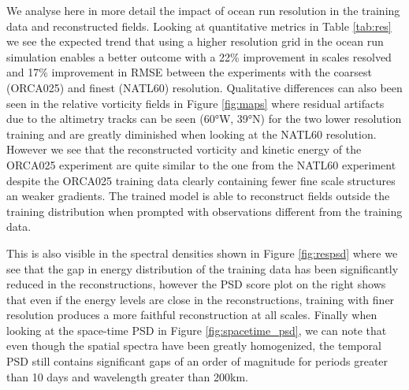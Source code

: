 \documentclass[draft]{agujournal2019}
\begin{document}
We analyse here in more detail the impact of ocean run resolution in the training data and reconstructed fields. Looking at quantitative metrics in Table \ref{tab:res} we see the expected trend that using a higher resolution grid in the ocean run simulation enables a better outcome with a 22\% improvement in scales resolved and 17\% improvement in RMSE between the experiments with the coarsest (ORCA025) and finest (NATL60) resolution.
Qualitative differences can also been seen in the relative vorticity fields in Figure \ref{fig:maps} where residual artifacts due to the altimetry tracks can be seen (60°W, 39°N) for the two lower resolution training and are greatly diminished when looking at the NATL60 resolution. 
However we see that the reconstructed vorticity and kinetic energy of the ORCA025 experiment are quite similar to the one from the NATL60 experiment despite the ORCA025 training data clearly containing fewer fine scale structures an weaker gradients. The trained model is able to reconstruct fields outside the training distribution when prompted with observations different from the training data. 

This is also visible in the spectral densities shown in Figure \ref{fig:respsd} where we see that the gap in energy distribution of the training data has been significantly reduced in the reconstructions, however the PSD score plot on the right shows that even if the energy levels are close in the reconstructions, training with finer resolution produces a more faithful reconstruction at all scales.
Finally when looking at the space-time PSD in Figure \ref{fig:spacetime_psd}, we can note that even though the spatial spectra have been greatly homogenized, the temporal PSD still contains significant gaps of an order of magnitude for periods greater than 10 days and wavelength greater than 200km.
\end{document}
